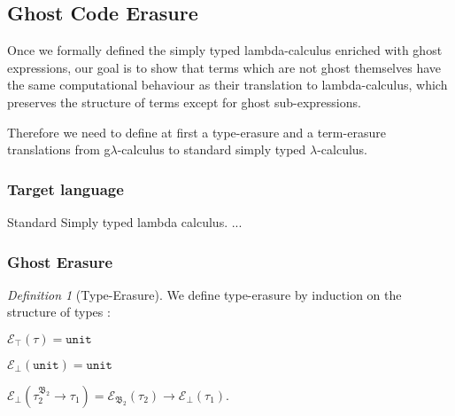 \subsection{Ghost Code Erasure}
\newcommand{\e}{\mathcal{E}}
\theoremstyle{remark}
\newtheorem{dfn}[theorem]{Definition}

\qquad Once we formally defined the simply typed lambda-calculus enriched with ghost expressions, our goal is to show that terms which are not ghost 
themselves have the same computational behaviour as their translation to
lambda-calculus, which preserves the structure of terms except for ghost sub-expressions. 

Therefore we need to define at first a type-erasure and a term-erasure translations from g$\lambda$-calculus to standard simply typed  
$\lambda$-calculus. 

\subsubsection{Target language} 
Standard Simply typed lambda calculus. ...
\subsubsection{Ghost Erasure}


\begin{dfn}[Type-Erasure] 
\label{type-erasure}
We define type-erasure by induction on the structure of types : \vspace{0.2cm} 

\noindent$ \e_{\top}(\tau) = \texttt{unit} $ 

\noindent$ \e_{\bot}(\texttt{unit}) = \texttt{unit}$ 

\noindent$ \e_{\bot}(\tau_{2}^{\mathfrak{B_{2}}} \rightarrow \tau_{1})  
= \e_{\mathfrak{B_{2}}}(\tau_{2}) \rightarrow \e_{\bot}(\tau_{1}) $. \\
\end{dfn} 

